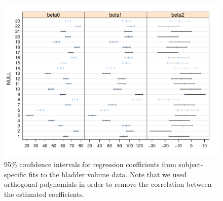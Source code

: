 \documentclass[cmfont,usenames,dvipsnames,leqno]{afit-etd}\usepackage[]{graphicx}\usepackage[]{color}
\makeatletter
\def\maxwidth{ %
  \ifdim\Gin@nat@width>\linewidth
    \linewidth
  \else
    \Gin@nat@width
  \fi
}
\newenvironment{knitrout}{}{} %
\renewenvironment{knitrout}{\begin{singlespace}}{\end{singlespace}}
\makeatother
\begin{document}
\begin{knitrout}
\color{fgcolor}\begin{figure}[H]

\includegraphics[width=\maxwidth]{figure/bladder-intervals} \caption[95\% confidence intervals for the bladder volume example]{95\% confidence intervals for regression coefficients from subject-specific fits to the bladder volume data. Note that we used orthogonal polynomials in order to remove the correlation between the estimated coefficients.\label{fig:bladder-intervals}}
\end{figure}


\end{knitrout}
\end{document}
